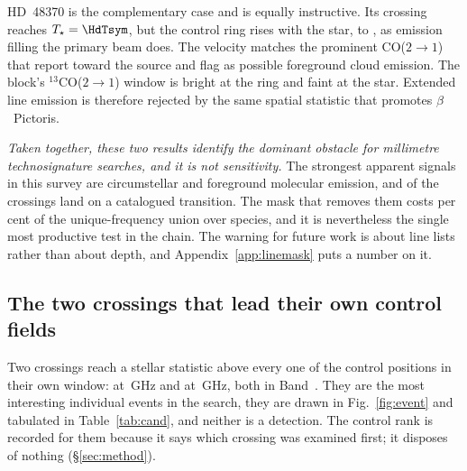 

HD~48370 is the complementary case and is equally instructive. Its crossing
reaches $T_\star=\HdTsym$, but the control ring rises with the star, to
\HdRingMax, as emission filling the primary beam does. The velocity matches
the prominent CO($2{\to}1$) that \citet{Cataldi2023} report toward the
source and flag as possible foreground cloud emission. The block's
$^{13}$CO($2{\to}1$) window is bright at the ring and faint at the star.
Extended line emission is therefore rejected by the same spatial statistic
that promotes $\beta$~Pictoris.

\emph{Taken together, these two results identify the dominant obstacle for
millimetre technosignature searches, and it is not sensitivity.} The
strongest apparent signals in this survey are circumstellar and foreground
molecular emission, and \NAttributed{} of the \NCross{} crossings land on a
catalogued transition. The mask that removes them costs \FrMaskPct{} per
cent of the unique-frequency union over \FrNSpec{} species, and it is
nevertheless the single most productive test in the chain. The warning for
future work is about line lists rather than about depth, and
Appendix~\ref{app:linemask} puts a number on it.

\subsection{The two crossings that lead their own control fields}
\label{sec:vistest}

Two crossings reach a stellar statistic above every one of the \NCtrl{}
control positions in their own window: \EvAStar{} at \EvAFreq\,GHz and
\EvBStar{} at \EvBFreq\,GHz, both in Band~\EvABand. They are the most
interesting individual events in the search, they are drawn in
Fig.~\ref{fig:event} and tabulated in Table~\ref{tab:cand}, and neither is a
detection. The control rank is recorded for them because it says which
crossing was examined first; it disposes of nothing (\S\ref{sec:method}).

